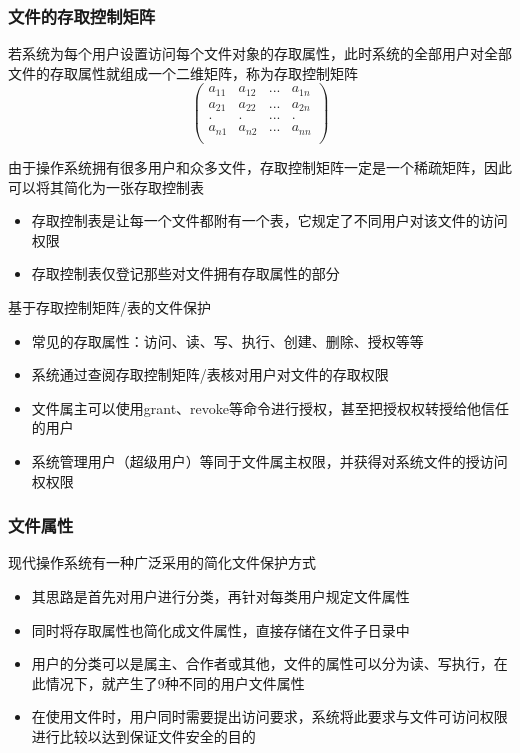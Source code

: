 \documentclass[cs4size,a4paper,10pt]{ctexart}
\begin{document}
	\subsubsection{文件的存取控制矩阵}
	若系统为每个用户设置访问每个文件对象的存取属性，此时系统的全部用户对全部文件的存取属性就组成一个二维矩阵，称为存取控制矩阵
	$$\begin{pmatrix}
		a_{11} & a_{12} & ... & a_{1n} \\
		a_{21} & a_{22} & ... & a_{2n} \\
		. & . & ... & . \\
		a_{n1} & a_{n2} & ... & a_{nn} \\
	  \end{pmatrix}$$

	由于操作系统拥有很多用户和众多文件，存取控制矩阵一定是一个稀疏矩阵，因此可以将其简化为一张存取控制表
	\begin{itemize}
		\item 存取控制表是让每一个文件都附有一个表，它规定了不同用户对该文件的访问权限
		\item 存取控制表仅登记那些对文件拥有存取属性的部分
	\end{itemize}

	基于存取控制矩阵/表的文件保护
	\begin{itemize}
		\item 常见的存取属性：访问、读、写、执行、创建、删除、授权等等
		\item 系统通过查阅存取控制矩阵/表核对用户对文件的存取权限
		\item 文件属主可以使用grant、revoke等命令进行授权，甚至把授权权转授给他信任的用户
		\item 系统管理用户（超级用户）等同于文件属主权限，并获得对系统文件的授访问权权限
	\end{itemize}

	\subsubsection{文件属性}
	现代操作系统有一种广泛采用的简化文件保护方式
	\begin{itemize}
		\item 其思路是首先对用户进行分类，再针对每类用户规定文件属性
		\item 同时将存取属性也简化成文件属性，直接存储在文件子日录中
		\item 用户的分类可以是属主、合作者或其他，文件的属性可以分为读、写执行，在此情况下，就产生了9种不同的用户文件属性
		\item 在使用文件时，用户同时需要提出访问要求，系统将此要求与文件可访问权限进行比较以达到保证文件安全的目的
	\end{itemize}
	
\end{document}
